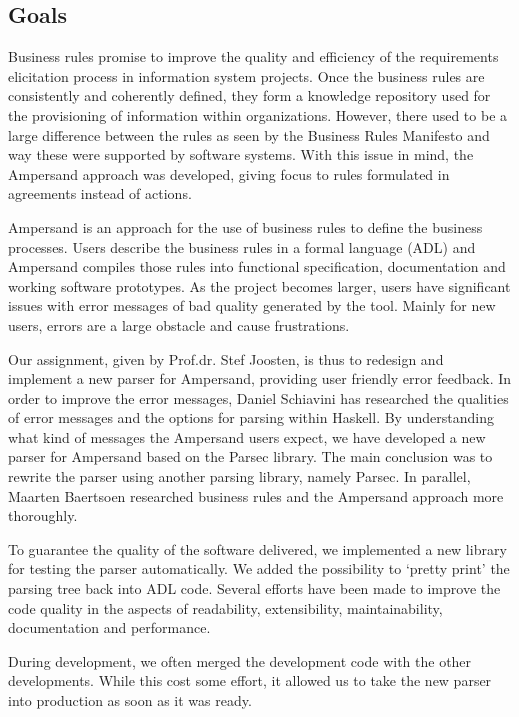 
\subsection{Goals}
Business rules promise to improve the quality and efficiency of the requirements elicitation process in information system projects.
Once the business rules are consistently and coherently defined, they form a knowledge repository used for the provisioning of information within organizations.
However, there used to be a large difference between the rules as seen by the Business Rules Manifesto and way these were supported by software systems.
With this issue in mind, the Ampersand approach was developed, giving focus to rules formulated in agreements instead of actions.

Ampersand is an approach for the use of business rules to define the business processes.
Users describe the business rules in a formal language (ADL) and Ampersand compiles those rules into functional specification, documentation and working software prototypes.
As the project becomes larger, users have significant issues with error messages of bad quality generated by the tool.
Mainly for new users, errors are a large obstacle and cause frustrations.

Our assignment, given by Prof.dr. Stef Joosten, is thus to redesign and implement a new parser for Ampersand, providing user friendly error feedback.
In order to improve the error messages, Daniel Schiavini has researched the qualities of error messages and the options for parsing within Haskell.
By understanding what kind of messages the Ampersand users expect, we have developed a new parser for Ampersand based on the Parsec library.
The main conclusion was to rewrite the parser using another parsing library, namely Parsec.
In parallel, Maarten Baertsoen researched business rules and the Ampersand approach more thoroughly.

To guarantee the quality of the software delivered, we implemented a new library for testing the parser automatically.
We added the possibility to `pretty print' the parsing tree back into ADL code.
Several efforts have been made to improve the code quality in the aspects of readability, extensibility, maintainability, documentation and performance.

During development, we often merged the development code with the other developments.
While this cost some effort, it allowed us to take the new parser into production as soon as it was ready.

